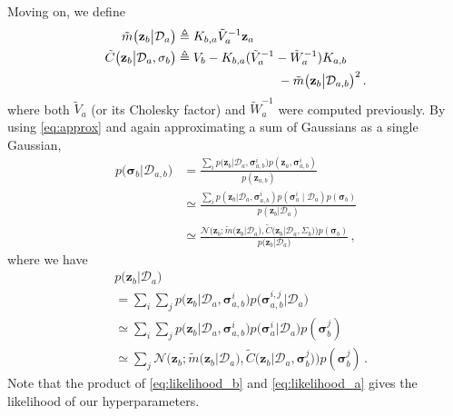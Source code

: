 \documentclass{article}
\newcommand{\cm}[1]{\ensuremath{\mathcal{#1}}}
\newcommand{\bm}[1]{\ensuremath{\mathbf{#1}}}
\newcommand{\data}{\ensuremath{\cm{D}}}
\newcommand{\vect}[1]{\bm{#1}}
\newcommand{\vz}{\vect{z}}
\newcommand{\vs}{\vect{\sigma}}
\newcommand{\amean}[2]{\tilde{{m}}\bigl(#1\big\vert#2\bigr)}
\newcommand{\acov}[2]{\tilde{{C}}\bigl(#1\big\vert#2\bigr)}
\newcommand{\p}[2]{p\bigl(#1\big\vert#2\bigr)}
\newcommand{\fPr}{p}
\newcommand{\Prob}[2]{\fPr\bigl(#1\big\vert#2\bigr)}
\newcommand{\ps}[2]{p(#1\vert#2)}
\newcommand{\N}[3]{\cm{N}\bigl(#1;#2,#3\bigr)}
\newcommand{\defequal}{\triangleq}
\begin{document}
 Moving on, we define
\begin{align}
\amean{\vz_b}{\data_a} & \defequal  
K_{b,a} \tilde{V}_a^{-1} \vz_a \label{eq;ameanba}
\\
\acov{\vz_b}{\data_{a},\vs_b}
& \defequal V_b - K_{b,a}(\tilde{V}_a^{-1}-\tilde{W}_a^{-1})K_{a,b} \nonumber\\
& \hspace{2.8cm} - \amean{\vz_b}{\data_{a,b}}^2 \,. \label{eq;acovba}
\end{align}
where both $\tilde{V}_a$ (or its Cholesky factor) and $\tilde{W}_a^{-1}$ were computed previously. By using \eqref{eq:approx} and again approximating a sum of Gaussians as a single Gaussian,
\begin{align}
\Prob{\vs_b}{\data_{a,b}} & = \frac{\sum_i \p{\vz_b}{\data_a,\vs^i_{a,b}}p(\vz_a,\vs^i_{a,b})}{p(\vz_{a,b})}\nonumber\\
& \simeq \frac{\sum_i \ps{\vz_b}{\data_a,\vs^i_{a,b}}\fPr(\vs_a^i\mid{\data_a})\fPr(\vs_{b})}{\ps{\vz_{b}}{\data_a}}\nonumber\\
& \simeq \frac{\N{\vz_b}{\amean{\vz_b}{\data_a}}{\acov{\vz_b}{\data_a, \Sigma_b}} \fPr(\vs_b)}{\p{\vz_{b}}{\data_a}}\,,\label{eq:psb}
\end{align}
where we have
\begin{align}
&\p{\vz_{b}}{\data_a}\nonumber\\
& = \sum_i \sum_j \p{\vz_b}{\data_a,\vs^i_{a,b}}\Prob{\vs^{i,j}_{a,b}}{\data_a}\nonumber\\
& \simeq \sum_i \sum_j \p{\vz_b}{\data_a,\vs^i_{a,b}}\Prob{\vs_a^i}{\data_a}\fPr(\vs_{b}^j)\nonumber\\
& \simeq \sum_j \N{\vz_b}{\amean{\vz_b}{\data_a}}{\acov{\vz_b}{\data_a, \vs_b^j}} \fPr(\vs_b^j)\,.\label{eq:likelihood_b}
\end{align}
Note that the product of \eqref{eq:likelihood_b} and \eqref{eq:likelihood_a} gives the likelihood of our hyperparameters. 
\end{document}
